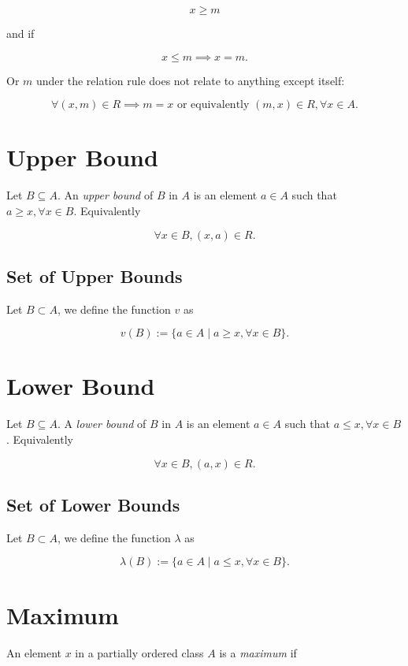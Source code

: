 \[
	x \ge m
\]

and if

\[
	x \le m \implies x = m.
\]

Or \(m\) under the relation rule does not relate to anything except itself:

\[
	\forall (x, m) \in R \implies m = x \text{ or equivalently } (m, x) \in R, \forall x \in A.
\]

\section{Upper Bound}

Let \(B \subseteq A\). An \emph{upper bound} of \(B\) in \(A\) is an element \(a \in A\) such that
\(a \ge x, \forall x \in B\). Equivalently

\[
	\forall x \in B, (x, a) \in R.
\]

\subsection{Set of Upper Bounds}

Let \(B \subset A\), we define the function \(v\) as

\[
	v(B) := \{a \in A \mid a \ge x, \forall x \in B \}.
\]

\section{Lower Bound}

Let \(B \subseteq A\). A \emph{lower bound} of \(B\) in \(A\) is an element \(a \in A\) such that
\(a \le x, \forall x \in B\). Equivalently

\[
	\forall x \in B, (a, x) \in R.
\]

\subsection{Set of Lower Bounds}

Let \(B \subset A\), we define the function \(\lambda\) as

\[
	\lambda(B) := \{a \in A \mid a \le x, \forall x \in B\}.
\]

\section{Maximum}

An element \(x\) in a partially ordered class \(A\) is a \emph{maximum} if

